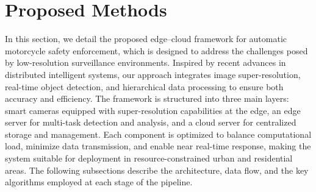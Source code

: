 \documentclass[conference]{IEEEtran}
\begin{document}
\section{Proposed Methods}
\label{sec:approaches}

In this section, we detail the proposed edge–cloud framework for automatic motorcycle safety enforcement, which is designed to address the challenges posed by low-resolution surveillance environments. Inspired by recent advances in distributed intelligent systems, our approach integrates image super-resolution, real-time object detection, and hierarchical data processing to ensure both accuracy and efficiency. The framework is structured into three main layers: smart cameras equipped with super-resolution capabilities at the edge, an edge server for multi-task detection and analysis, and a cloud server for centralized storage and management. Each component is optimized to balance computational load, minimize data transmission, and enable near real-time response, making the system suitable for deployment in resource-constrained urban and residential areas. The following subsections describe the architecture, data flow, and the key algorithms employed at each stage of the pipeline.
\end{document}
